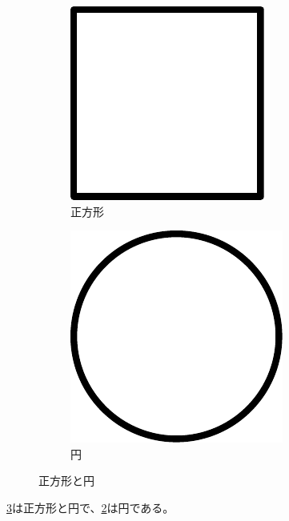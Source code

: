 \begin{figure}[ht]
  \centering
  \begin{subfigure}[t]{0.45\textwidth}
  \centering
    \includegraphics[width=0.8\linewidth]{examples/figures/square}
    \caption{正方形}\label{subfig:square}
  \end{subfigure}
  \quad
  \begin{subfigure}[t]{0.45\textwidth}
  \centering
    \includegraphics[width=0.8\linewidth]{examples/figures/circle}
    \caption{円}\label{subfig:circle}
  \end{subfigure}
  \caption{正方形と円}\label{fig:square-circle}
\end{figure}

\cref{fig:square-circle}は正方形と円で、\cref{subfig:circle}は円である。
